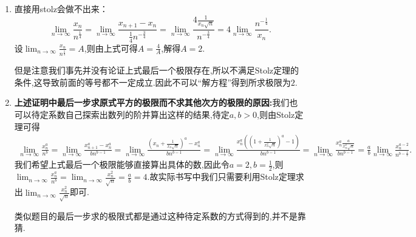 \documentclass[../../main.tex]{subfiles}
\begin{document}
\begin{remark}
\begin{enumerate}
\item 直接用stolz会做不出来：
\[
\lim_{n\rightarrow \infty} \frac{x_n}{n^{\frac{1}{4}}}=\lim_{n\rightarrow \infty} \frac{x_{n+1}-x_n}{\frac{1}{4}n^{-\frac{3}{4}}}=\lim_{n\rightarrow \infty} \frac{4\frac{1}{x_n\sqrt{n}}}{n^{-\frac{3}{4}}}=4\lim_{n\rightarrow \infty} \frac{n^{-\frac{1}{4}}}{x_n}.
\]
设$\lim_{n\rightarrow \infty} \frac{x_n}{n^{\frac{1}{4}}}=A$,则由上式可得$A=\frac{4}{A}$,解得$A=2$.

但是注意我们事先并没有论证上式最后一个极限存在,所以不满足Stolz定理的条件,这导致前面的等号都不一定成立.因此不可以“解方程”得到所求极限为\(2\).

\item \textbf{上述证明中最后一步求原式平方的极限而不求其他次方的极限的原因:}我们也可以待定系数自己探索出数列的阶并算出这样的结果,待定$a,b>0$,则由Stolz定理可得
\begin{align*}
\lim_{n\rightarrow \infty} \frac{x_{n}^{a}}{n^b}=\lim_{n\rightarrow \infty} \frac{x_{n+1}^{a}-x_{n}^{a}}{bn^{b-1}}=\lim_{n\rightarrow \infty} \frac{\left( x_n+\frac{1}{x_n\sqrt{n}} \right) ^a-x_{n}^{a}}{bn^{b-1}}=\lim_{n\rightarrow \infty} \frac{x_{n}^{a}\left( \left( 1+\frac{1}{x_{n}^{2}\sqrt{n}} \right) ^a-1 \right)}{bn^{b-1}}
=\lim_{n\rightarrow \infty} \frac{x_{n}^{a}\frac{a}{x_{n}^{2}\sqrt{n}}}{bn^{b-1}}=\frac{a}{b}\lim_{n\rightarrow \infty} \frac{x_{n}^{a-2}}{n^{b-\frac{1}{2}}}.
\end{align*}
我们希望上式最后一个极限能够直接算出具体的数,因此令$a=2,b=\frac{1}{2}$,则$\lim_{n\rightarrow \infty} \frac{x_{n}^{a}}{n^b}=\lim_{n\rightarrow \infty} \frac{x_{n}^{2}}{\sqrt{n}}=\frac{a}{b}=4$.故实际书写中我们只需要利用Stolz定理求出\(\lim_{n\rightarrow\infty}\frac{x_n^{2}}{\sqrt{n}}\)即可.

类似题目的最后一步求的极限式都是通过这种待定系数的方式得到的,并不是靠猜.
\end{enumerate}
\end{remark}
\end{document}
